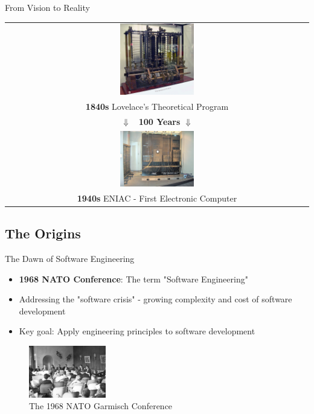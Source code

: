 \documentclass{beamer}
\begin{document}
\begin{frame}[t]{From Vision to Reality}
\begin{center}
    \begin{tabular}{c}
        \includegraphics[width=0.25\textwidth]{images/AnalyticalMachine_Babbage_London.jpg} \\
        \textbf{1840s} Lovelace's Theoretical Program \\
        $\Downarrow$ \textbf{~100 Years} $\Downarrow$ \\
        \includegraphics[width=0.25\textwidth]{images/ENIAC_Penn1.jpg} \\
        \textbf{1940s} ENIAC - First Electronic Computer \\
    \end{tabular}
\end{center}
\end{frame}
\subsection{The Origins}

\begin{frame}[t]{The Dawn of Software Engineering}
\begin{itemize}
    \item \textbf{1968 NATO Conference}: The term "Software Engineering" 
    \item Addressing the "software crisis" - growing complexity and cost of software development
    \item Key goal: Apply engineering principles to software development
\end{itemize}
    \begin{figure}[b]
        \centering
        \includegraphics[width=0.3\textwidth]{images/NATO-conference-photo.png}
        \caption{The 1968 NATO Garmisch Conference}
    \end{figure}
\end{frame}
\end{document}

